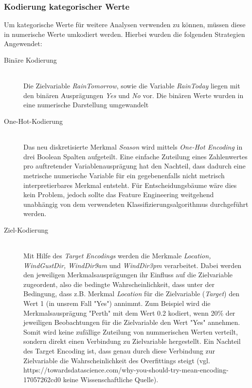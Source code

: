 \subsubsection{Kodierung kategorischer Werte}
Um kategorische Werte für weitere Analysen verwenden zu können, müssen diese in numerische Werte umkodiert werden. Hierbei wurden die folgenden Strategien Angewendet:
\begin{description}
	\item[Binäre Kodierung]\hfill \\
	Die Zielvariable \emph{RainTomorrow}, sowie die Variable \emph{RainToday} liegen mit den binären Ausprägungen \emph{Yes} und \emph{No} vor. Die binären Werte wurden in eine numerische Darstellung umgewandelt
	\item[One-Hot-Kodierung]\hfill \\ 
	Das neu diskretisierte Merkmal \emph{Season} wird mittels \emph{One-Hot Encoding} in drei Boolean Spalten aufgeteilt. Eine einfache Zuteilung eines Zahlenwertes pro auftretender Variablenausprägung hat den Nachteil, dass dadurch eine metrische numerische Variable für ein gegebenenfalls nicht metrisch interpretierbares Merkmal entsteht. Für Entscheidungsbäume wäre dies kein Problem, jedoch sollte das Feature Engineering weitgehend unabhängig von dem verwendeten Klassifizierungsalgorithmus durchgeführt werden.
	\item[Ziel-Kodierung]\hfill \\ 
	Mit Hilfe des \emph{Target Encodings} werden die Merkmale \emph{Location, WindGustDir, WindDir9am} und \emph{WindDir3pm} verarbeitet. Dabei werden den jeweiligen Merkmalsausprägungen ihr Einfluss auf die Zielvariable zugeordent, also die bedingte Wahrscheinlichkeit, dass unter der Bedingung, dass z.B. Merkmal \emph{Location} für die Zielvariable (\emph{Target}) den Wert 1 (in unsrem Fall "Yes") annimmt. Zum Beispiel wird die Merkmalsausprägung "Perth" mit dem Wert 0.2 kodiert, wenn 20\% der jeweiligen Beobachtungen für die Zielvariable den Wert "Yes"  annehmen.  Somit wird keine zufällige Zuteilung von nummerischen Werten verteilt, sondern direkt einen Verbindung zu Zielvariable hergestellt. Ein Nachteil des Target Encoding ist, dass genau durch diese Verbindung zur Zielvariable die Wahrscheinlichkeit des Overfittings steigt (vgl. https://towardsdatascience.com/why-you-should-try-mean-encoding-17057262cd0   keine Wissenschaftliche Quelle).
\end{description}

